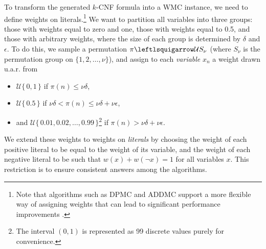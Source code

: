 \documentclass{article}
\theoremstyle{definition}
\theoremstyle{remark}
\begin{document}
To transform the generated $k$-CNF formula into a \textsf{WMC} instance, we need
to define weights on literals.\footnote{Note that algorithms such as
  \textsc{DPMC} \cite{DBLP:conf/cp/DudekPV20} and \textsc{ADDMC}
  \cite{DBLP:conf/aaai/DudekPV20} support a more flexible way of assigning
  weights that can lead to significant performance improvements
  \cite{my_uai_paper,my_sat_paper}.} We want to partition all variables into
three groups: those with weights equal to zero and one, those with weights equal
to 0.5, and those with arbitrary weights, where the size of each group is
determined by $\delta$ and $\epsilon$. To do this, we sample a permutation $\pi
\leftlsquigarrow \mathcal{U}S_\nu$ (where $S_\nu$ is the permutation group on $\{
1, 2, \dots, \nu \}$), and assign to each \emph{variable} $x_n$ a weight drawn
u.a.r. from
\begin{itemize}
\item $\mathcal{U}\{\,0, 1\,\}$ if $\pi(n) \le \nu\delta$,
\item $\mathcal{U}\{\,0.5\,\}$ if $\nu\delta < \pi(n) \le \nu\delta +
  \nu\epsilon$,
\item and $\mathcal{U}\{\, 0.01, 0.02, \dots, 0.99 \,\}$\footnote{The interval
    $(0, 1)$ is represented as 99 discrete values purely for convenience.} if
  $\pi(n) > \nu\delta + \nu\epsilon$.
\end{itemize}
We extend these weights to weights on \emph{literals} by choosing the weight of
each positive literal to be equal to the weight of its variable, and the weight
of each negative literal to be such that $w(x) + w(\neg x) = 1$ for all
variables $x$. This restriction is to ensure consistent answers among the
algorithms.
\end{document}
